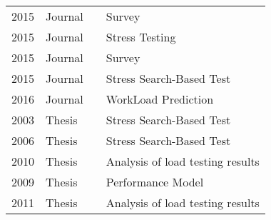 \begin{table}[]
\begin{tabular}{llll}
2015          & Journal          & \cite{Jiang2015}                & Survey                           \\
2015          & Journal          & \cite{Luo2015}                  & Stress Testing                   \\
2015          & Journal          & \cite{Harman2015}               & Survey                           \\
2015          & Journal          & \cite{Alesio2015}               & Stress Search-Based Test         \\
2016          & Journal          & \cite{Vogele2016}               & WorkLoad Prediction              \\
2003          & Thesis           & \cite{Shousha2003}              & Stress Search-Based Test         \\
2006          & Thesis           & \cite{Garousi2006}              & Stress Search-Based Test         \\
2010          & Thesis           & \cite{Jiang2010}                & Analysis of load testing results \\
2009          & Thesis           & \cite{Ganapathi2009}            & Performance Model                \\
2011          & Thesis           & \cite{Vetoio2011}               & Analysis of load testing results
\end{tabular}
\end{table}

